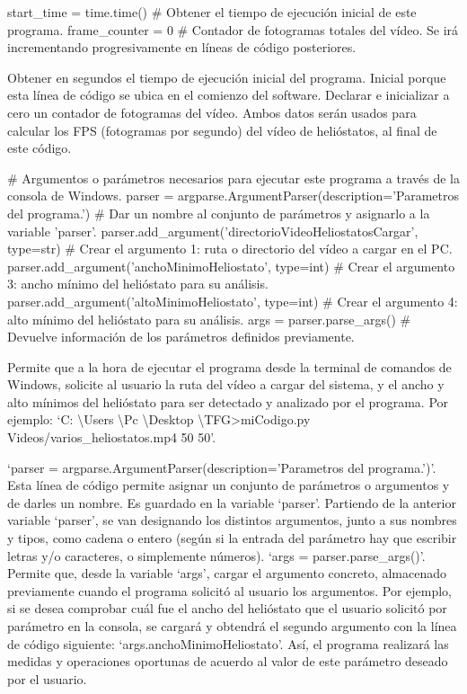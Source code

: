 \documentclass[12pt]{article}
\begin{document}
start\_time = time.time() \# Obtener el tiempo de ejecución inicial de este programa.
frame\_counter = 0 \# Contador de fotogramas totales del vídeo. Se irá incrementando progresivamente en líneas de código posteriores.

Obtener en segundos el tiempo de ejecución inicial del programa. Inicial porque esta línea de código se ubica en el comienzo del software. Declarar e inicializar a cero un contador de fotogramas del vídeo. Ambos datos serán usados para calcular los FPS (fotogramas por segundo) del vídeo de helióstatos, al final de este código.


\# Argumentos o parámetros necesarios para ejecutar este programa a través de la consola de Windows.
parser = argparse.ArgumentParser(description='Parametros del programa.') \# Dar un nombre al conjunto de parámetros y asignarlo a la variable 'parser'.
parser.add\_argument('directorioVideoHeliostatosCargar', type=str) \# Crear el argumento 1: ruta o directorio del vídeo a cargar en el PC.
parser.add\_argument('anchoMinimoHeliostato', type=int) \# Crear el argumento 3: ancho mínimo del helióstato para su análisis.
parser.add\_argument('altoMinimoHeliostato', type=int) \# Crear el argumento 4: alto mínimo del helióstato para su análisis.
args = parser.parse\_args() \# Devuelve información de los parámetros definidos previamente.

Permite que a la hora de ejecutar el programa desde la terminal de comandos de Windows, solicite al usuario la ruta del vídeo a cargar del sistema, y el ancho y alto mínimos del helióstato para ser detectado y analizado por el programa. Por ejemplo: ‘C: \textbackslash Users \textbackslash Pc \textbackslash Desktop \textbackslash TFG>miCodigo.py Videos/varios\_heliostatos.mp4 50 50’.

‘parser = argparse.ArgumentParser(description='Parametros del programa.')’. Esta línea de código permite asignar un conjunto de parámetros o argumentos y de darles un nombre. Es guardado en la variable ‘parser’.
Partiendo de la anterior variable ‘parser’, se van designando los distintos argumentos, junto a sus nombres y tipos, como cadena o entero (según si la entrada del parámetro hay que escribir letras y/o caracteres, o simplemente números).
‘args = parser.parse\_args()’. Permite que, desde la variable ‘args’, cargar el argumento concreto, almacenado previamente cuando el programa solicitó al usuario los argumentos. Por ejemplo, si se desea comprobar cuál fue el ancho del helióstato que el usuario solicitó por parámetro en la consola, se cargará y obtendrá el segundo argumento con la línea de código siguiente: ‘args.anchoMinimoHeliostato’. Así, el programa realizará las medidas y operaciones oportunas de acuerdo al valor de este parámetro deseado por el usuario.
\end{document}
